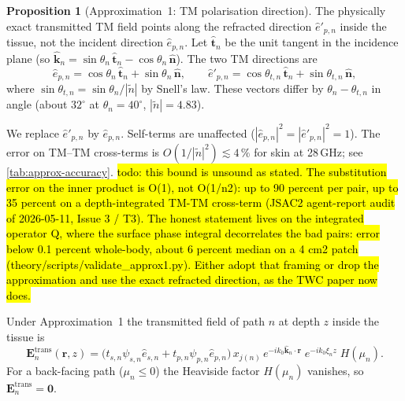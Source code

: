 \documentclass[11pt,a4paper]{article}
\theoremstyle{definition}      %
\newtheorem{proposition}[proposition]{Proposition}
\begin{document}
\begin{proposition}[Approximation~1: TM polarisation direction]\label{prop:approx1}
The physically exact transmitted TM field points along the
refracted direction $\hat{e}'_{p,n}$ inside the tissue, not the
incident direction $\hat{e}_{p,n}$.  Let $\hat{\mathbf{t}}_n$ be the
unit tangent in the incidence plane (so
$\hat{\mathbf{k}}_n = \sin\theta_n\,\hat{\mathbf{t}}_n -
\cos\theta_n\,\hat{\mathbf{n}}$).  The two TM directions are
\begin{equation}\label{eq:ep-vs-epp}
  \hat{e}_{p,n}  = \cos\theta_n\,\hat{\mathbf{t}}_n
                  + \sin\theta_n\,\hat{\mathbf{n}},
  \qquad
  \hat{e}'_{p,n} = \cos\theta_{t,n}\,\hat{\mathbf{t}}_n
                  + \sin\theta_{t,n}\,\hat{\mathbf{n}},
\end{equation}
where $\sin\theta_{t,n} = \sin\theta_n/|\tilde{n}|$ by Snell's law.
These vectors differ by $\theta_n - \theta_{t,n}$ in angle (about
$32^\circ$ at $\theta_n = 40^\circ$, $|\tilde{n}| = 4.83$).

We replace $\hat{e}'_{p,n}$ by $\hat{e}_{p,n}$.  Self-terms are
unaffected ($|\hat{e}_{p,n}|^2 = |\hat{e}'_{p,n}|^2 = 1$).  The
error on TM--TM cross-terms is $O(1/|\tilde{n}|^2) \lesssim 4\,\%$
for skin at 28\,GHz; see \cref{tab:approx-accuracy}.
\hl{todo: this bound is unsound as stated. The substitution error on
the inner product is O(1), not O(1/n2): up to 90 percent per pair, up
to 35 percent on a depth-integrated TM-TM cross-term (JSAC2
agent-report audit of 2026-05-11, Issue 3 / T3). The honest statement
lives on the integrated operator Q, where the surface phase integral
decorrelates the bad pairs: error below 0.1 percent whole-body, about
6 percent median on a 4 cm2 patch (theory/scripts/validate\_approx1.py).
Either adopt that framing or drop the approximation and use the exact
refracted direction, as the TWC paper now does.}
\end{proposition}

Under Approximation~1 the transmitted field of path $n$ at depth $z$
inside the tissue is
\begin{equation}\label{eq:Etrans}
  \mathbf{E}_n^\mathrm{trans}(\mathbf{r}, z)
  = \bigl(t_{s,n}\psi_{s,n}\hat{e}_{s,n}
         + t_{p,n}\psi_{p,n}\hat{e}_{p,n}\bigr)\,x_{j(n)}\,
    e^{-ik_0\hat{\mathbf{k}}_n\cdot\mathbf{r}}\;
    e^{-ik_0\xi_n z}\;H(\mu_n).
\end{equation}
For a back-facing path ($\mu_n \leq 0$) the Heaviside factor $H(\mu_n)$ vanishes, so
$\mathbf{E}_n^\mathrm{trans} = \mathbf{0}$.
\end{document}
